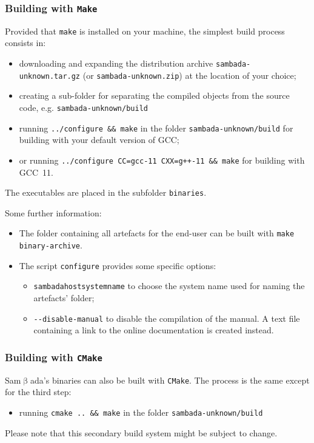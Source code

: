 \documentclass[a4paper,11pt]{article}
\newcommand{\versionnumber}{unknown}
\newcommand{\smb}{\textsf{Sam$\upbeta$ada}}
\newcommand{\prog}[1]{\texttt{#1}}
\begin{document}
\subsubsection*{Building with \prog{Make}}
Provided that \prog{make} is installed on your machine, the simplest build process consists in:
\begin{itemize}
\item{downloading and expanding the distribution archive \prog{sambada-\versionnumber.tar.gz} (or \prog{sambada-\versionnumber.zip}) at the location of your choice;} 
\item{creating a sub-folder for separating the compiled objects from the source code, e.g. \prog{sambada-\versionnumber/build}}
\item{running \prog{../configure \&\& make} in the folder \prog{sambada-\versionnumber/build} for building with your default version of GCC;}
\item{or running \prog{../configure CC=gcc-11 CXX=g++-11 \&\& make} for building with GCC~11.}
\end{itemize}
The executables are placed in the subfolder \prog{binaries}.

Some further information: 
\begin{itemize}
\item{The folder containing all artefacts for the end-user can be built with \prog{make binary-archive}.}
\item{The script \prog{configure} provides some specific options:
\begin{itemize}
\item{\prog{sambadahostsystemname} to choose the system name used for naming the artefacts' folder;}
\item{\prog{-{}-disable-manual} to disable the compilation of the manual. A text file containing a link to the online documentation is created instead.}
\end{itemize}
}
\end{itemize}

\subsubsection*{Building with \prog{CMake}}
\smb's binaries can also be built with \prog{CMake}. The process is the same except for the third step:
\begin{itemize}
\item{running \prog{cmake .. \&\& make} in the folder \prog{sambada-\versionnumber/build}}
\end{itemize}
Please note that this secondary build system might be subject to change.
\end{document}
